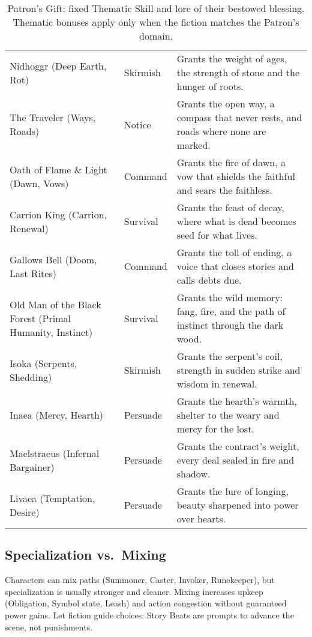 \begin{table}[H]
\begin{tabular}{@{}p{3.8cm}p{3.8cm}p{7.5cm}@{}}
Nidhoggr (Deep Earth, Rot) & Skirmish & Grants the weight of ages, the strength of stone and the hunger of roots. \\
The Traveler (Ways, Roads) & Notice & Grants the open way, a compass that never rests, and roads where none are marked. \\
Oath of Flame \& Light (Dawn, Vows) & Command & Grants the fire of dawn, a vow that shields the faithful and sears the faithless. \\
Carrion King (Carrion, Renewal) & Survival & Grants the feast of decay, where what is dead becomes seed for what lives. \\
Gallows Bell (Doom, Last Rites) & Command & Grants the toll of ending, a voice that closes stories and calls debts due. \\
Old Man of the Black Forest (Primal Humanity, Instinct) & Survival & Grants the wild memory: fang, fire, and the path of instinct through the dark wood. \\
Isoka (Serpents, Shedding) & Skirmish & Grants the serpent’s coil, strength in sudden strike and wisdom in renewal. \\
Inaea (Mercy, Hearth) & Persuade & Grants the hearth’s warmth, shelter to the weary and mercy for the lost. \\
Maelstraeus (Infernal Bargainer) & Persuade & Grants the contract’s weight, every deal sealed in fire and shadow. \\
Livaea (Temptation, Desire) & Persuade & Grants the lure of longing, beauty sharpened into power over hearts. \\
\bottomrule
\end{tabular}
\caption{Patron’s Gift: fixed Thematic Skill and lore of their bestowed blessing. Thematic bonuses apply only when the fiction matches the Patron’s domain.}
\label{tab:gift-thematic-map}
\end{table}

\subsection{Specialization vs.\ Mixing}
\label{subsec:mixing}
Characters can mix paths (Summoner, Caster, Invoker, Runekeeper), but specialization is usually stronger and cleaner. Mixing increases upkeep (Obligation, Symbol state, Leash) and action congestion without guaranteed power gains. Let fiction guide choices: Story Beats are prompts to advance the scene, not punishments.


